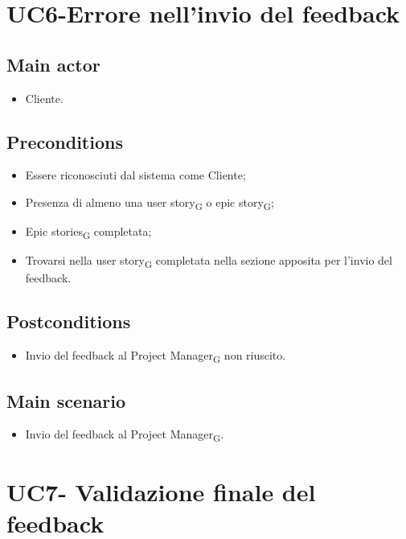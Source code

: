 \documentclass{article}
\begin{document}
\section{UC6-Errore nell'invio del feedback}

     \subsection*{Main actor}
     \begin{itemize}
         \item Cliente.
     \end{itemize}
     \subsection*{Preconditions} 
 \begin{itemize}
        \item Essere riconosciuti dal sistema come Cliente;
        \item Presenza di almeno una user story\textsubscript{G}  o epic story\textsubscript{G};
        \item Epic stories\textsubscript{G}  completata;
        \item Trovarsi nella user story\textsubscript{G}  completata nella sezione apposita per l'invio del feedback.
    \end{itemize}
     \subsection*{Postconditions} 
        \begin{itemize}
            \item Invio del feedback al Project Manager\textsubscript{G}  non riuscito.
        \end{itemize} 
        \subsection*{Main scenario}
        \begin{itemize}
            \item Invio del feedback al Project Manager\textsubscript{G}.
        \end{itemize}

        
\section{UC7- Validazione finale del feedback}
\end{document}
